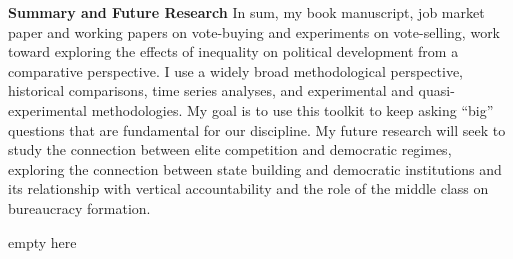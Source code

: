 \documentclass[11pt]{letter} %
\begin{document}
\begin{letter}{}
{\bf Summary and Future Research} In sum, my book manuscript, job market paper and working papers on vote-buying and experiments on vote-selling, work toward exploring the effects of inequality on political development from a comparative perspective. I use a widely broad methodological perspective, historical comparisons, time series analyses, and experimental and quasi-experimental methodologies. My goal is to use this toolkit to keep asking ``big'' questions that are fundamental for our discipline. My future research will seek to study the connection between elite competition and democratic regimes, exploring the connection between state building and democratic institutions and its relationship with vertical accountability and the role of the middle class on bureaucracy formation.\vspace{-10cm}

\closing{{\color{white}empty here}}


{\color{white}\encl{}}


\end{letter}
\end{document}
